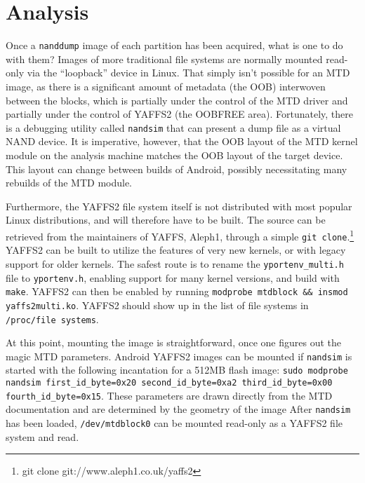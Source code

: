 \section{Analysis}

Once a \texttt{nanddump} image of each partition has been acquired, what is one to do with them?  Images of more traditional
file systems are normally mounted read-only via the ``loopback'' device in Linux.  That simply isn't possible for an MTD image, as
there is a significant amount of metadata (the OOB) interwoven between the blocks, which is partially under the control of the MTD
driver and partially under the control of YAFFS2 (the OOBFREE area).  Fortunately, there is a debugging utility called
\texttt{nandsim} that can present a dump file as a virtual NAND device. It is imperative, however, that the OOB layout of the MTD
kernel module on the analysis machine matches the OOB layout of the target device.  This layout can change between builds of Android,
possibly necessitating many rebuilds of the MTD module. 

Furthermore, the YAFFS2 file system itself is not distributed with most popular Linux distributions, and will therefore have to be built.
The source can be retrieved from the maintainers of YAFFS, Aleph1, through a simple \texttt{git clone}.\footnote{git clone git://www.aleph1.co.uk/yaffs2} YAFFS2 can be built to utilize the features of very new kernels, or with legacy support for older kernels. 
The safest route is to rename the \texttt{yportenv\_multi.h} file to \texttt{yportenv.h}, enabling support for many kernel versions, and build with \texttt{make}. 
YAFFS2 can then be enabled by running \texttt{modprobe mtdblock \&\& insmod yaffs2multi.ko}. 
YAFFS2 should show up in the list of file systems in \texttt{/proc/file systems}.

At this point, mounting the image is straightforward, once one figures out the magic MTD parameters.
Android YAFFS2 images can be mounted if \texttt{nandsim} is started with the following incantation for a 512MB flash image:
\texttt{sudo modprobe nandsim first\_id\_byte=0x20 second\_id\_byte=0xa2 third\_id\_byte=0x00 fourth\_id\_byte=0x15}.
These parameters are drawn directly from the MTD documentation and are determined by the geometry of the image \cite{mtdfaq}
After \texttt{nandsim} has been loaded, \texttt{/dev/mtdblock0} can be mounted read-only as a YAFFS2 file system and read.

